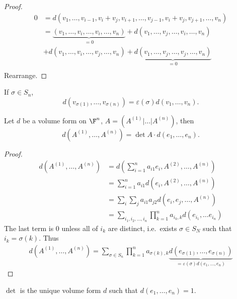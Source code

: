 \documentclass[a4paper]{article}
\theoremstyle{definition}
\begin{document}
\begin{proof}
  \begin{align*}
    0 &= d(v_1, \dots, v_{i-1}, v_i + v_j, v_{i+1}, \dots, v_{j-1}, v_i + v_j, v_{j + 1}, \dots, v_n) \\
      &= \underbrace{(v_1, \dots, v_i, \dots, v_i, \dots, v_n)}_{ = 0} + d(v_1, \dots, v_j, \dots, v_i, \dots, v_n) \\
      &+ d(v_1, \dots, v_i, \dots, v_j, \dots, v_n) + \underbrace{d(v_1, \dots, v_j, \dots, v_j, \dots, v_n)}_{ = 0} \\
  \end{align*}
  Rearrange.
\end{proof}

\begin{corollary}
  If \(\sigma \in S_n\),
  \[
    d(v_{\sigma(1)}, \dots, v_{\sigma(n)}) = \varepsilon(\sigma) d(v_1, \dots, v_n).
  \]
\end{corollary}

\begin{theorem}
  Let \(d\) be a volume form on \(\F^n\), \(A = (A^{(1)}|\dots | A^{(n)})\), then
  \[
    d(A^{(1)}, \dots, A^{(n)}) = \det A \cdot d(e_1, \dots, e_n).
  \]
\end{theorem}

\begin{proof}
  \begin{align*}
    d(A^{(1)}, \dots, A^{(n)}) &= d \left( \sum_{i=1}^{n} a_{i1}e_i, A^{(2)}, \dots, A^{(n)} \right) \\
                               &= \sum_{i = 1}^{n}a_{i1} d(e_i, A^{(2)}, \dots, A^{(n)}) \\
                               &= \sum_{i}^{} \sum_{j}^{ } a_{i1} a_{j2} d(e_i, e_j, \dots, A^{(n)}) \\
                               &= \sum_{i_1, i_2, \dots, i_n}^{ } \prod_{k = 1}^{n} a_{{i_k},k} d(e_{i_1}, \dots e_{i_n})
\end{align*}
The last term is \(0\) unless all of \(i_k\) are distinct, i.e.\ exists \(\sigma \in S_N\) such that \(i_k = \sigma(k)\). Thus
\begin{align*}
  d(A^{(1)}, \dots, A^{(n)}) = \sum_{\sigma \in S_n}^{ } \prod_{k = 1}^{n} a_{\sigma(k), k} \underbrace{d(e_{\sigma(1)}, \dots, e_{\sigma(n)})}_{= \varepsilon(\sigma) d(e_1, \dots, e_n)}
\end{align*}
\end{proof}

\begin{corollary}
  \(\det\) is the unique volume form \(d\) such that \(d(e_1, \dots, e_n) = 1\).
\end{corollary}
\end{document}
